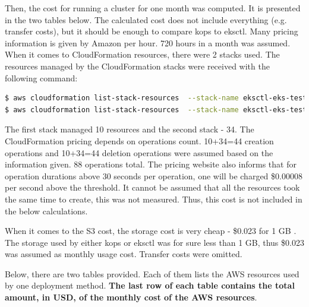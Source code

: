 Then, the cost for running a cluster for one month was computed. It is presented in the two tables below. The calculated cost does not include everything (e.g. transfer costs), but it should be enough to compare kops to eksctl. Many pricing information is given by Amazon per hour. 720 hours in a month was assumed. When it comes to CloudFormation resources, there were 2 stacks used. The resources managed by the CloudFormation stacks were received with the following command:
\begin{lstlisting}[basicstyle=\tiny,caption={AWS CLI commands used to list CloudFormation resources used by eksctl},captionpos=b,language=Bash,xleftmargin=1cm]
$ aws cloudformation list-stack-resources  --stack-name eksctl-eks-testing-nodegroup-ng-1
$ aws cloudformation list-stack-resources  --stack-name eksctl-eks-testing-cluster
\end{lstlisting}
The first stack managed 10 resources and the second stack - 34. The CloudFormation pricing \cite{amazon-cf-pricing} depends on operations count. 10+34=44 creation operations and 10+34=44 deletion operations were assumed based on the information given. 88 operations total. The pricing website also informs that for operation durations above 30 seconds per operation, one will be charged \$0.00008 per second above the threshold. It cannot be assumed that all the resources took the same time to create, this was not measured. Thus, this cost is not included in the below calculations.

When it comes to the S3 cost, the storage cost is very cheap - \$0.023 for 1 GB \cite{s3-pricing}. The storage used by either kops or eksctl was for sure less than 1 GB, thus \$0.023 was assumed as monthly usage cost. Transfer costs were omitted.

Below, there are two tables provided. Each of them lists the AWS resources used by one deployment method. \textbf{The last row of each table contains the total amount, in USD, of the monthly cost of the AWS resources}.

